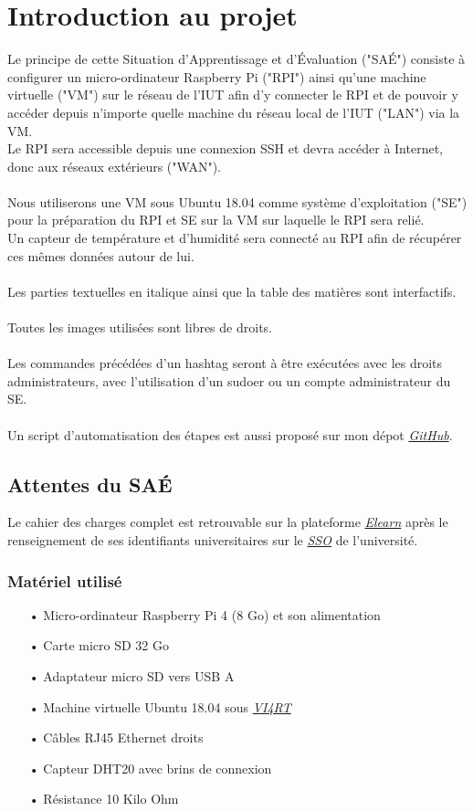 \documentclass[a4paper]{article}
\begin{document}
\section{Introduction au projet}
Le principe de cette Situation d'Apprentissage et d'Évaluation ("SAÉ") consiste à configurer un micro-ordinateur Raspberry Pi ("RPI") ainsi qu'une machine virtuelle ("VM") sur le réseau de l'IUT afin d'y connecter le RPI et de pouvoir y accéder depuis n'importe quelle machine du réseau local de l'IUT ("LAN") via la VM.\\Le RPI sera accessible depuis une connexion SSH et devra accéder à Internet, donc aux réseaux extérieurs ("WAN").\\\\Nous utiliserons une VM sous Ubuntu 18.04 comme système d'exploitation ("SE") pour la préparation du RPI et SE sur la VM sur laquelle le RPI sera relié.\\Un capteur de température et d'humidité sera connecté au RPI afin de récupérer ces mêmes données autour de lui.\\\\Les parties textuelles en italique ainsi que la table des matières sont interfactifs.\\\\Toutes les images utilisées sont libres de droits.\\\\Les commandes précédées d'un hashtag seront à être exécutées avec les droits administrateurs, avec l'utilisation d'un sudoer ou un compte administrateur du SE.\\\\Un script d'automatisation des étapes est aussi proposé sur mon dépot \href{}{\textit{GitHub}}.
\subsection{Attentes du SAÉ}
Le cahier des charges complet est retrouvable sur la plateforme \href{https://elearn.univ-pau.fr/course/view.php?id=18202}{\textit{Elearn}} après le renseignement de ses identifiants universitaires sur le \href{https://sso.univ-pau.fr/cas/login}{\textit{SSO}} de l'université.
\subsubsection{Matériel utilisé}
\begin{itemize}
    \item[•] Micro-ordinateur Raspberry Pi 4 (8 Go) et son alimentation
    \item[•] Carte micro SD 32 Go
    \item[•] Adaptateur micro SD vers USB A
    \item[•] Machine virtuelle Ubuntu 18.04 sous \href{http://vi4rt.univ-pau.fr/}{\textit{VI4RT}}
    \item[•] Câbles RJ45 Ethernet droits
    \item[•] Capteur DHT20 avec brins de connexion
    \item[•] Résistance 10 Kilo Ohm
\end{itemize}
\end{document}
